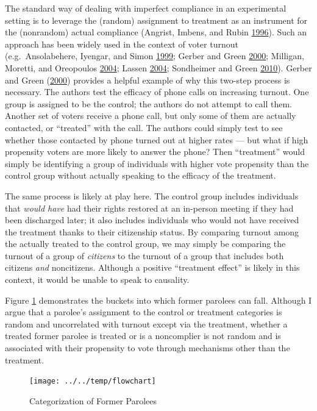 \documentclass[
  12pt,
]{article}
\begin{document}
The standard way of dealing with imperfect compliance in an experimental setting is to leverage the (random) assignment to treatment as an instrument for the (nonrandom) actual compliance (Angrist, Imbens, and Rubin \protect\hyperlink{ref-Angrist1996}{1996}). Such an approach has been widely used in the context of voter turnout (e.g.~Ansolabehere, Iyengar, and Simon \protect\hyperlink{ref-Ansolabehere1999}{1999}; Gerber and Green \protect\hyperlink{ref-Gerber2000}{2000}; Milligan, Moretti, and Oreopoulos \protect\hyperlink{ref-Milligan2004}{2004}; Lassen \protect\hyperlink{ref-Lassen2004}{2004}; Sondheimer and Green \protect\hyperlink{ref-Sondheimer2010}{2010}). Gerber and Green (\protect\hyperlink{ref-Gerber2000}{2000}) provides a helpful example of why this two-step process is necessary. The authors test the efficacy of phone calls on increasing turnout. One group is assigned to be the control; the authors do not attempt to call them. Another set of voters receive a phone call, but only some of them are actually contacted, or ``treated'' with the call. The authors could simply test to see whether those contacted by phone turned out at higher rates --- but what if high propensity voters are more likely to answer the phone? Then ``treatment'' would simply be identifying a group of individuals with higher vote propensity than the control group without actually speaking to the efficacy of the treatment.

The same process is likely at play here. The control group includes individuals that \emph{would have} had their rights restored at an in-person meeting if they had been discharged later; it also includes individuals who would not have received the treatment thanks to their citizenship status. By comparing turnout among the actually treated to the control group, we may simply be comparing the turnout of a group of \emph{citizens} to the turnout of a group that includes both citizens \emph{and} noncitizens. Although a positive ``treatment effect'' is likely in this context, it would be unable to speak to causality.

Figure \ref{fig:flow} demonstrates the buckets into which former parolees can fall. Although I argue that a parolee's assignment to the control or treatment categories is random and uncorrelated with turnout except via the treatment, whether a treated former parolee is treated or is a noncomplier is not random and is associated with their propensity to vote through mechanisms other than the treatment.

\begin{figure}[H]

{\centering \texttt{[image: ../../temp/flowchart]} 

}

\caption{\label{fig:flow}Categorization of Former Parolees}\label{fig:flow}
\end{figure}
\end{document}
